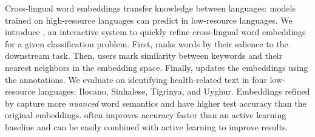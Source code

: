 
Cross-lingual word embeddings transfer knowledge between languages: models trained on high-resource languages can predict in low-resource languages.
We introduce \name{}, an interactive system to
quickly refine cross-lingual word embeddings for a given classification problem.
First, \name{} ranks words by their salience to the downstream task.
Then, users mark similarity between keywords and their nearest neighbors in the embedding space.
Finally, \name{} updates the embeddings using the annotations.
We evaluate \name{} on
identifying health-related text in four low-resource languages: Ilocano, Sinhalese, Tigrinya, and Uyghur.
Embeddings refined by \name{} capture more \emph{nuanced} word semantics and have higher test accuracy than the original embeddings.
\name{} often improves accuracy faster than an active learning baseline and can be easily combined with active learning to improve results.
